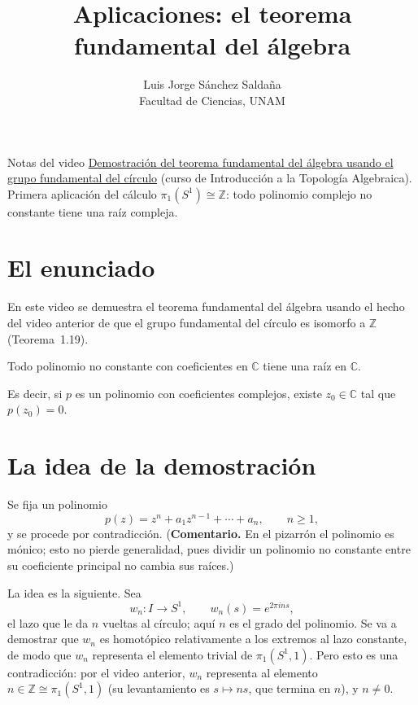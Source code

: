 \documentclass[11pt]{article}
\title{Aplicaciones: el teorema fundamental del álgebra}
\author{Luis Jorge Sánchez Saldaña\\[2pt]\small Facultad de Ciencias, UNAM}
\date{}
\begin{document}
\maketitle

\noindent\small Notas del video
\href{https://www.youtube.com/watch?v=9Pb5F2l8Rhc}{\guillemotleft{}Demostración del teorema fundamental del álgebra usando el grupo fundamental del círculo\guillemotright{}}
(curso de Introducción a la Topología Algebraica). Primera aplicación del cálculo $\pi_1(S^1)\cong\mathbb{Z}$: todo polinomio complejo no constante tiene una raíz compleja.
\normalsize

\section*{El enunciado}

En este video se demuestra el teorema fundamental del álgebra usando el hecho del video anterior de que el grupo fundamental del círculo es isomorfo a $\mathbb{Z}$ (Teorema~1.19).

\begin{teo}
Todo polinomio no constante con coeficientes en $\mathbb{C}$ tiene una raíz en $\mathbb{C}$.
\end{teo}

Es decir, si $p$ es un polinomio con coeficientes complejos, existe $z_0\in\mathbb{C}$ tal que $p(z_0)=0$.

\section*{La idea de la demostración}

Se fija un polinomio
\[
  p(z)=z^n+a_1z^{n-1}+\cdots+a_n,\qquad n\ge 1,
\]
y se procede por contradicción. (\textbf{Comentario.} En el pizarrón el polinomio es mónico; esto no pierde generalidad, pues dividir un polinomio no constante entre su coeficiente principal no cambia sus raíces.)

La idea es la siguiente. Sea
\[
  w_n\colon I\to S^1,\qquad w_n(s)=e^{2\pi i n s},
\]
el lazo que le da $n$ vueltas al círculo; aquí $n$ es el grado del polinomio. Se va a demostrar que $w_n$ es homotópico relativamente a los extremos al lazo constante, de modo que $w_n$ representa el elemento trivial de $\pi_1(S^1,1)$. Pero esto es una contradicción: por el video anterior, $w_n$ representa al elemento $n\in\mathbb{Z}\cong\pi_1(S^1,1)$ (su levantamiento es $s\mapsto ns$, que termina en $n$), y $n\neq 0$.
\end{document}
